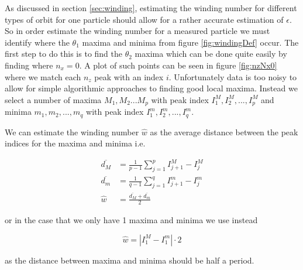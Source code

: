 As discussed in section \ref{sec:winding}, estimating the winding number for different types of orbit for one particle 
should allow for a rather accurate estimation of $\epsilon$. So in order estimate the winding number for a measured 
particle we must identify where the $\theta_1$ maxima and minima from figure \ref{fig:windingDef} occur. The first step 
to do this is to find the $\theta_2$ maxima which can be done quite easily by finding where $n_x = 0$. A plot of such 
points can be seen in figure \ref{fig:nzNx0} where we match each $n_z$ peak with an index $i$. Unfortunately data is too noisy to allow for simple algorithmic approaches 
to finding good local maxima. Instead we select a number of maxima $M_1, M_2 ... M_p$ with peak index $I^M_1, I^M_2, ..., I^M_p$  and minima $m_1, m_2, ..., m_q$ with peak index $I^m_1, I^m_2, ..., I^m_q$.

We can estimate the winding number $\hat{w}$ as the average distance between the peak indices for the maxima and minima i.e. 

\begin{align}
\overline{d_M} &= \frac{1}{p-1} \sum\limits_{j=1}^{p} I^M_{j+1} - I^M_{j} \\
\overline{d_m} &= \frac{1}{q-1} \sum\limits_{j=1}^{q} I^m_{j+1}- I^m_{j}\\
\hat{w}   &= \frac{\overline{d_M} + \overline{d_m}}{2}
\end{align}

or in the case that we only have 1 maxima and minima we use instead

\begin{equation}
\hat{w} = \left| I^M_1 - I^m_1 \right| \cdot 2
\end{equation}

as the distance between maxima and minima should be half a period.